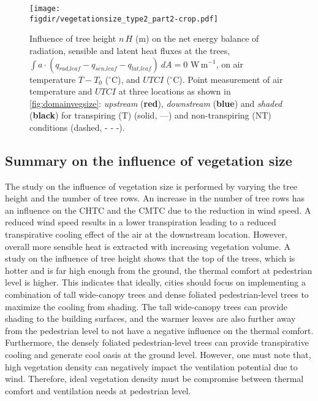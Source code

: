 	\begin{sidewaysfigure}[p]
	\centering
	\texttt{[image: \\figdir/vegetationsize\_type2\_part2-crop.pdf]}
	\caption{Influence of tree height $n\,H$ (m) on  the net energy balance of radiation, sensible and latent heat fluxes at the trees, $\int a \cdot (q_{\textit{rad,leaf}}-q_{\textit{sen,leaf}}-q_{\textit{lat,leaf}})\ dA = 0$ W\,m$^{-1}$,  on air temperature $T-T_0$ ($^{\circ}$C), and  $\textit{UTCI}$ ($^{\circ}$C). Point measurement of air temperature and $UTCI$ at three locations as shown in \cref{fig:domainvegsize}: \textit{upstream} ({\color{flatuidarkred}\textbf{red}}), \textit{downstream} ({\color{flatuidarkblue}\textbf{blue}}) and \textit{shaded} (\textbf{black}) for transpiring (T) (solid, ---) and non-transpiring (NT) conditions (dashed, - - -).}
	\label{fig:vegetationsizepart2}
	\end{sidewaysfigure}

\subsection{Summary on the influence of vegetation size}

The study on the influence of vegetation size is performed by varying the tree height and the number of tree rows. An increase in the number of tree rows has an influence on the CHTC and the CMTC due to the reduction in wind speed. A reduced wind speed results in a lower transpiration leading to a reduced transpirative cooling effect of the air at the downstream location. However, overall more sensible heat is extracted with increasing vegetation volume. A study on the influence of tree height shows that the top of the trees, which is hotter and is far high enough from the ground, the thermal comfort at pedestrian level is higher. This indicates that ideally, cities should focus on implementing a combination of tall wide-canopy trees and dense foliated pedestrian-level trees to maximize the cooling from shading. The tall wide-canopy trees can provide shading to the building surfaces, and the warmer leaves are also further away from the pedestrian level to not have a negative influence on the thermal comfort. Furthermore, the densely foliated pedestrian-level trees can provide transpirative cooling and generate cool oasis at the ground level. However, one must note that, high vegetation density can negatively impact the ventilation potential due to wind. Therefore, ideal vegetation density must be compromise between thermal comfort and ventilation needs at pedestrian level.


